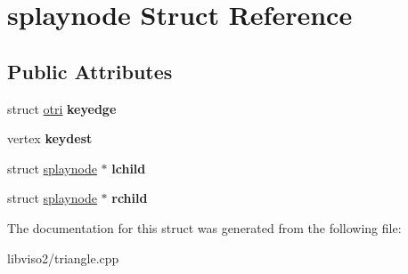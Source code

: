 \hypertarget{structsplaynode}{\section{splaynode Struct Reference}
\label{structsplaynode}
}
\subsection*{Public Attributes}
\begin{DoxyCompactItemize}
\item 
\hypertarget{structsplaynode_aaa9fc6e2d568c0be2a5a4c0831965c4f}{struct \hyperlink{structotri}{otri} {\bfseries keyedge}}\label{structsplaynode_aaa9fc6e2d568c0be2a5a4c0831965c4f}

\item 
\hypertarget{structsplaynode_a63438aac02b8993141ebf848c347098d}{vertex {\bfseries keydest}}\label{structsplaynode_a63438aac02b8993141ebf848c347098d}

\item 
\hypertarget{structsplaynode_a67b52cb89e958acbdf9761ea4aab6813}{struct \hyperlink{structsplaynode}{splaynode} $\ast$ {\bfseries lchild}}\label{structsplaynode_a67b52cb89e958acbdf9761ea4aab6813}

\item 
\hypertarget{structsplaynode_ac1cf5f799931eda1315037dc7d0bce3a}{struct \hyperlink{structsplaynode}{splaynode} $\ast$ {\bfseries rchild}}\label{structsplaynode_ac1cf5f799931eda1315037dc7d0bce3a}

\end{DoxyCompactItemize}


The documentation for this struct was generated from the following file\+:\begin{DoxyCompactItemize}
\item 
libviso2/triangle.\+cpp\end{DoxyCompactItemize}
